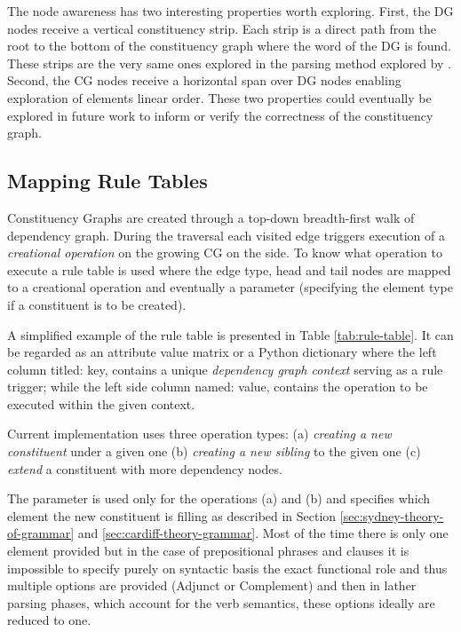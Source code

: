 The node awareness has two interesting properties worth exploring. First, the DG nodes receive a vertical constituency strip. Each strip is a direct path from the root to the bottom of the constituency graph where the word of the DG is found. These strips are the very same ones explored in the parsing method explored by \citet{Day2007}.    
Second, the CG nodes receive a horizontal span over DG nodes enabling exploration of elements linear order. These two properties could eventually be explored in future work to inform or verify the correctness of the constituency graph.

\subsection{Mapping Rule Tables}
\label{sec:mapping-rule-table}

Constituency Graphs are created through a top-down breadth-first walk of dependency graph. During the traversal each visited edge triggers execution of a \textit{creational operation} on the growing CG on the side. To know what operation to execute a rule table is used where the edge type, head and tail nodes are mapped to a creational operation and eventually a parameter (specifying the element type if a constituent is to be created).

A simplified example of the rule table is presented in Table \ref{tab:rule-table}. It can be regarded as an attribute value matrix or a Python dictionary where the left column titled: key, contains a unique \textit{dependency graph context} serving as a rule trigger; while the left side column named: value, contains the operation to be executed within the given context. 

Current implementation uses three operation types: (a) \textit{creating a new constituent} under a given  one (b) \textit{creating a new sibling} to the given one (c) \textit{extend} a constituent with more dependency nodes. 

The parameter is used only for the operations (a) and (b) and specifies which element the new constituent is filling as described in Section \ref{sec:sydney-theory-of-grammar} and \ref{sec:cardiff-theory-grammar}. Most of the time there is only one element provided but in the case of prepositional phrases and clauses it is impossible to specify purely on syntactic basis the exact functional role and thus multiple options are provided (Adjunct or Complement) and then in lather parsing phases, which account for the verb semantics, these options ideally are reduced to one.  

